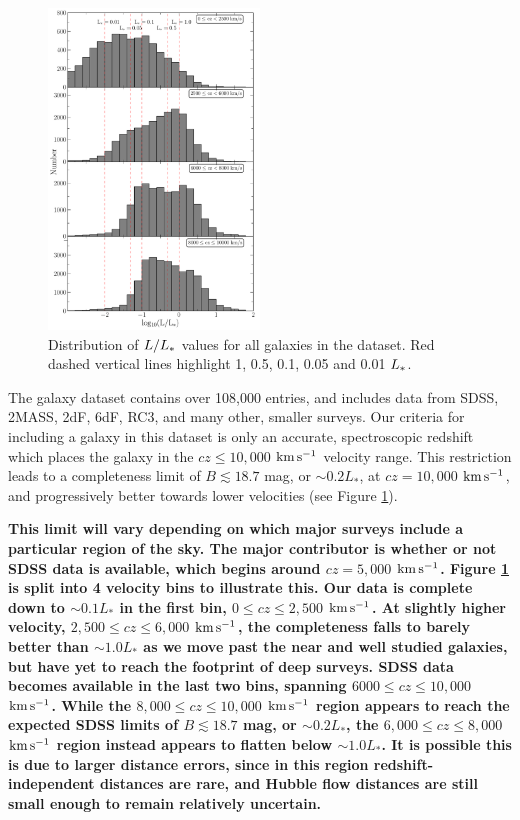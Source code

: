 \documentclass[twocolumn,tighten]{aastex6}
\begin{document}
\begin{figure}[b!]
        \centering
        \vspace{0pt}
        \includegraphics[width=0.50\textwidth]{fig1.pdf}
        \caption{\small{Distribution of $L/L_{\**}$ values for all galaxies in the dataset. Red dashed vertical lines highlight 1, 0.5, 0.1, 0.05 and 0.01 $L_{\**}$.}}
        \label{completeness}
\end{figure} 

The galaxy dataset contains over 108,000 entries, and includes data from SDSS, 2MASS, 2dF, 6dF, RC3, and many other, smaller surveys. Our criteria for including a galaxy in this dataset is only an accurate, spectroscopic redshift which places the galaxy in the $cz \leq 10,000$ $\rm km\, s^{-1}$ velocity range. This restriction leads to a completeness limit of $B \lesssim 18.7$ mag, or $\sim0.2 L_*$, at $cz = 10,000$ $\rm km\, s^{-1}$, and progressively better towards lower velocities (see Figure \ref{completeness}). 

\textbf{This limit will vary depending on which major surveys include a particular region of the sky. The major contributor is whether or not SDSS data is available, which begins around $cz = 5,000$ $\rm km\, s^{-1}$. Figure \ref{completeness} is split into 4 velocity bins to illustrate this. Our data is complete down to $\sim0.1 L_*$ in the first bin, $0 \leq cz \leq 2,500$ $\rm km\, s^{-1}$. At slightly higher velocity, $2,500 \leq cz \leq 6,000$ $\rm km\, s^{-1}$, the completeness falls to barely better than $\sim1.0 L_*$ as we move past the near and well studied galaxies, but have yet to reach the footprint of deep surveys. SDSS data becomes available in the last two bins, spanning $6000 \leq cz \leq 10,000$ $\rm km\, s^{-1}$. While the $8,000 \leq cz \leq 10,000$ $\rm km\, s^{-1}$ region appears to reach the expected SDSS limits of $B \lesssim 18.7$ mag, or $\sim0.2 L_*$, the $6,000 \leq cz \leq 8,000$ $\rm km\, s^{-1}$ region instead appears to flatten below $\sim 1.0 L_*$. It is possible this is due to larger distance errors, since in this region redshift-independent distances are rare, and Hubble flow distances are still small enough to remain relatively uncertain.}
\end{document}
